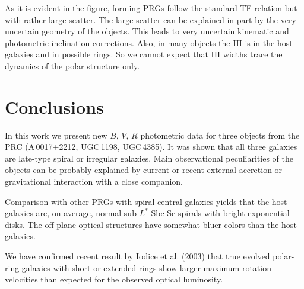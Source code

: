 \documentclass[]{aa}
\begin{document}
As it is evident in the figure, forming PRGs follow the standard
TF relation but with rather large scatter. The large scatter can
be explained in part by the very uncertain geometry of the objects.
This leads to very uncertain kinematic and photometric inclination
corrections. Also, in many objects the HI is in the host galaxies and
in possible rings. So we cannot expect that HI widths trace the 
dynamics of the polar structure only.

\section{Conclusions}

In this work we present new $B$, $V$, $R$ photometric data for three 
objects from the PRC (A\,0017+2212, UGC\,1198, UGC\,4385). 
It was shown that all three galaxies are late-type
spiral or irregular galaxies. Main observational peculiarities of the 
objects can be probably explained by current or recent external
accretion or gravitational interaction with a close companion.

Comparison with other PRGs with spiral central galaxies yields that
the host galaxies are, on average, normal sub-$L^*$ Sbc-Sc spirals with 
bright exponential disks. 
The off-plane optical structures have 
somewhat bluer colors than 
the host galaxies.

We have confirmed recent result by Iodice et al. (2003) that 
true evolved polar-ring galaxies with short or extended rings
show larger maximum rotation velocities than expected for the
observed optical luminosity.

\end{document}
